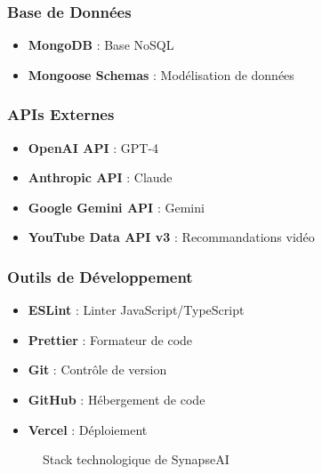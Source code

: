 \subsubsection{Base de Données}

\begin{itemize}
    \item \textbf{MongoDB} : Base NoSQL
    \item \textbf{Mongoose Schemas} : Modélisation de données
\end{itemize}

\subsubsection{APIs Externes}

\begin{itemize}
    \item \textbf{OpenAI API} : GPT-4
    \item \textbf{Anthropic API} : Claude
    \item \textbf{Google Gemini API} : Gemini
    \item \textbf{YouTube Data API v3} : Recommandations vidéo
\end{itemize}

\subsubsection{Outils de Développement}

\begin{itemize}
    \item \textbf{ESLint} : Linter JavaScript/TypeScript
    \item \textbf{Prettier} : Formateur de code
    \item \textbf{Git} : Contrôle de version
    \item \textbf{GitHub} : Hébergement de code
    \item \textbf{Vercel} : Déploiement
\end{itemize}

\begin{figure}[H]
    \centering
    \caption{Stack technologique de SynapseAI}
    \label{fig:stack-tech}
\end{figure}

